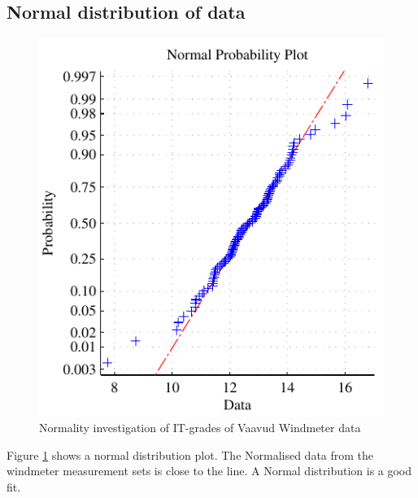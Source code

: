 \documentclass[aip,amsmath, reprint, author-year,nobalancelastpage]{revtex4-1}
\begin{document}
\subsection{Normal distribution of data}
\begin{figure}[H]
\includegraphics{Normal_plot.pdf}
\caption{\label{fig:normplot} Normality investigation of IT-grades of Vaavud Windmeter data   }
\end{figure}

Figure \ref{fig:normplot} shows a normal distribution plot. The Normalised data from the windmeter measurement sets is close to the line. A Normal distribution is a good fit.


\newpage
\end{document}
